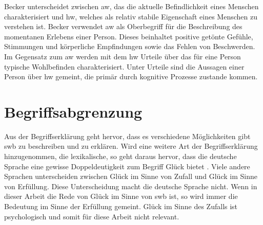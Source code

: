 Becker \cite{Becker:1994} unterscheidet zwischen \gls{aw}, das die aktuelle Befindlichkeit eines Menschen charakterisiert und \gls{hw}, welches als relativ stabile Eigenschaft eines Menschen zu verstehen ist. Becker verwendet \gls{aw} als Oberbegriff für die Beschreibung des momentanen Erlebens einer Person. Dieses beinhaltet positive getönte Gefühle, Stimmungen und körperliche Empfindungen sowie das Fehlen von Beschwerden. Im Gegensatz zum \gls{aw} werden mit dem \gls{hw} Urteile über das für eine Person typische Wohlbefinden charakterisiert. Unter Urteile sind die Aussagen einer Person über \gls{hw} gemeint, die primär durch kognitive Prozesse zustande kommen.

\section{Begriffsabgrenzung}\label{abgrenzung}
Aus der Begriffserklärung geht hervor, dass es verschiedene Möglichkeiten gibt \gls{swb} zu beschreiben und zu erklären. Wird eine weitere Art der Begriffserklärung hinzugenommen, die lexikalische, so geht daraus hervor, dass die deutsche Sprache eine gewisse Doppeldeutigkeit zum Begriff Glück bietet \cite{Mayring:1991}. Viele andere Sprachen unterscheiden zwischen Glück im Sinne von Zufall und Glück im Sinne von Erfüllung. Diese Unterscheidung macht die deutsche Sprache nicht. Wenn in dieser Arbeit die Rede von Glück im Sinne von \gls{swb} ist, so wird immer die Bedeutung im Sinne der Erfüllung gemeint. Glück im Sinne des Zufalls ist psychologisch und somit für diese Arbeit nicht relevant.

